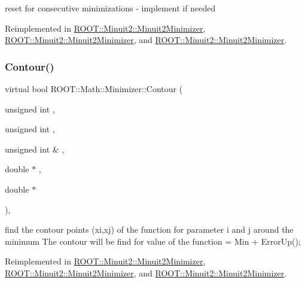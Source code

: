 reset for consecutive minimizations -\/ implement if needed 



Reimplemented in \mbox{\hyperlink{classROOT_1_1Minuit2_1_1Minuit2Minimizer_a11e6ce9a4285080548f9855b78ca83b4}{R\+O\+O\+T\+::\+Minuit2\+::\+Minuit2\+Minimizer}}, \mbox{\hyperlink{classROOT_1_1Minuit2_1_1Minuit2Minimizer_a11e6ce9a4285080548f9855b78ca83b4}{R\+O\+O\+T\+::\+Minuit2\+::\+Minuit2\+Minimizer}}, and \mbox{\hyperlink{classROOT_1_1Minuit2_1_1Minuit2Minimizer_a11e6ce9a4285080548f9855b78ca83b4}{R\+O\+O\+T\+::\+Minuit2\+::\+Minuit2\+Minimizer}}.

\mbox{\label{classROOT_1_1Math_1_1Minimizer_aeb8855190ff2e37911c38ed839f2043c}} 
\subsubsection{\texorpdfstring{Contour()}{Contour()}\hspace{0.1cm}{\footnotesize\ttfamily [1/3]}}
{\footnotesize\ttfamily virtual bool R\+O\+O\+T\+::\+Math\+::\+Minimizer\+::\+Contour (\begin{DoxyParamCaption}\item[{unsigned int}]{,  }\item[{unsigned int}]{,  }\item[{unsigned int \&}]{,  }\item[{double $\ast$}]{,  }\item[{double $\ast$}]{ }\end{DoxyParamCaption})\hspace{0.3cm}{\ttfamily [inline]}, {\ttfamily [virtual]}}

find the contour points (xi,xj) of the function for parameter i and j around the minimum The contour will be find for value of the function = Min + Error\+Up(); 

Reimplemented in \mbox{\hyperlink{classROOT_1_1Minuit2_1_1Minuit2Minimizer_a026780c27dd4b179817f826f49e36c8e}{R\+O\+O\+T\+::\+Minuit2\+::\+Minuit2\+Minimizer}}, \mbox{\hyperlink{classROOT_1_1Minuit2_1_1Minuit2Minimizer_a026780c27dd4b179817f826f49e36c8e}{R\+O\+O\+T\+::\+Minuit2\+::\+Minuit2\+Minimizer}}, and \mbox{\hyperlink{classROOT_1_1Minuit2_1_1Minuit2Minimizer_a026780c27dd4b179817f826f49e36c8e}{R\+O\+O\+T\+::\+Minuit2\+::\+Minuit2\+Minimizer}}.

